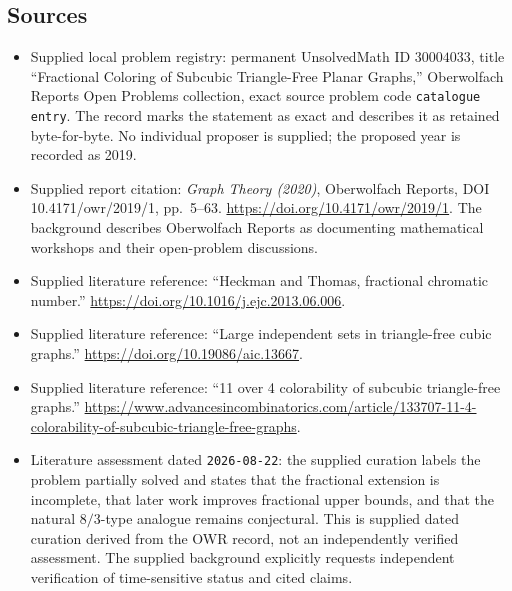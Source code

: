 \documentclass[11pt]{article}
\begin{document}
\subsection{Sources}
\begin{itemize}
\item Supplied local problem registry: permanent UnsolvedMath ID \(30004033\), title ``Fractional Coloring of Subcubic Triangle-Free Planar Graphs,'' Oberwolfach Reports Open Problems collection, exact source problem code \texttt{catalogue entry}. The record marks the statement as exact and describes it as retained byte-for-byte. No individual proposer is supplied; the proposed year is recorded as 2019.
\item Supplied report citation: \emph{Graph Theory (2020)}, Oberwolfach Reports, DOI 10.4171/owr/2019/1, pp.\ 5--63. \url{https://doi.org/10.4171/owr/2019/1}. The background describes Oberwolfach Reports as documenting mathematical workshops and their open-problem discussions.
\item Supplied literature reference: ``Heckman and Thomas, fractional chromatic number.'' \url{https://doi.org/10.1016/j.ejc.2013.06.006}.
\item Supplied literature reference: ``Large independent sets in triangle-free cubic graphs.'' \url{https://doi.org/10.19086/aic.13667}.
\item Supplied literature reference: ``11 over 4 colorability of subcubic triangle-free graphs.'' \url{https://www.advancesincombinatorics.com/article/133707-11-4-colorability-of-subcubic-triangle-free-graphs}.
\item Literature assessment dated \texttt{2026-08-22}: the supplied curation labels the problem partially solved and states that the fractional extension is incomplete, that later work improves fractional upper bounds, and that the natural \(8/3\)-type analogue remains conjectural. This is supplied dated curation derived from the OWR record, not an independently verified assessment. The supplied background explicitly requests independent verification of time-sensitive status and cited claims.
\end{itemize}
\end{document}
